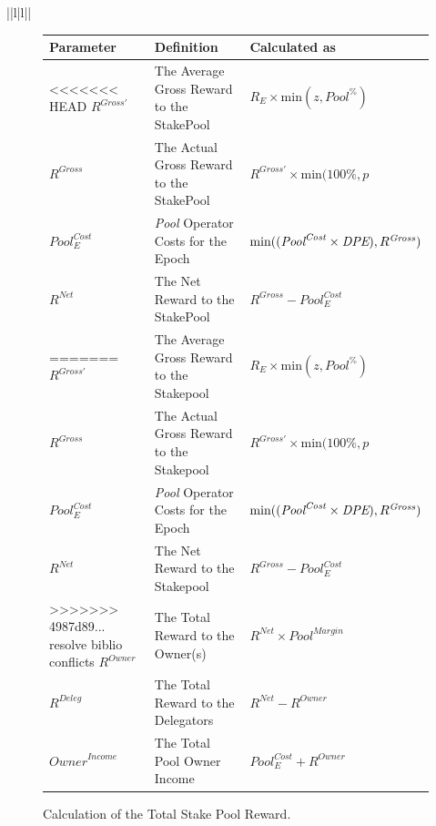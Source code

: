 \documentclass[11pt,a4paper,dvipsnames,twosided,final]{article}
\begin{document}
\begin{tabular}{||l|l||}
\clearpage
\begin{figure}[h!]
\begin{center}
\begin{tabular}{||l|p{7.8cm}|l||}
  \hline \hline
\textbf{Parameter}  & \textbf{Definition} & \textbf{Calculated as} \\\hline
<<<<<<< HEAD
$R^{Gross'}$ & The Average Gross Reward to the StakePool & $R_E \times \textrm{min} (z,{\textit{Pool}}^\%)$ \\\hline
$R^{\textit{Gross}}$ & The Actual Gross Reward to the StakePool & $R^{Gross'} \times \textrm{min} (100\%,p$ \\\hline
${\textit{Pool}}^{\textit{Cost}}_E$ & \textit{Pool} Operator Costs for the Epoch & $\textrm{min}((\textit{\textit{Pool}}^{\textit{Cost}} \times \textit{DPE}),R^{\textit{Gross}})$ \\\hline
$R^{\textit{Net}}$  & The Net Reward to the StakePool & $R^{\textit{Gross}} - {\textit{Pool}}^{\textit{Cost}}_E$ \\\hline
=======
$R^{Gross'}$ & The Average Gross Reward to the Stakepool & $R_E \times \textrm{min} (z,{\textit{Pool}}^\%)$ \\\hline
$R^{\textit{Gross}}$ & The Actual Gross Reward to the Stakepool & $R^{Gross'} \times \textrm{min} (100\%,p$ \\\hline
${\textit{Pool}}^{\textit{Cost}}_E$ & \textit{Pool} Operator Costs for the Epoch & $\textrm{min}((\textit{\textit{Pool}}^{\textit{Cost}} \times \textit{DPE}),R^{\textit{Gross}})$ \\\hline
$R^{\textit{Net}}$  & The Net Reward to the Stakepool & $R^{\textit{Gross}} - {\textit{Pool}}^{\textit{Cost}}_E$ \\\hline
>>>>>>> 4987d89... resolve biblio conflicts
$R^{Owner}$ & The Total Reward to the Owner(s) & $R^{\textit{Net}} \times {\textit{Pool}}^{\textit{Margin}} $ \\\hline
$R^{Deleg}$ & The Total Reward to the Delegators & $R^{\textit{Net}} - R^{Owner}$ \\\hline
$\textit{Owner}^\textit{Income}$ & The Total Pool Owner Income & ${\textit{Pool}}^{\textit{Cost}}_E + R^{Owner}$ \\\hline
\hline
\end{tabular}
\end{center}
\caption{Calculation of the Total Stake Pool Reward.}
\end{figure}


\end{tabular}
\end{document}
